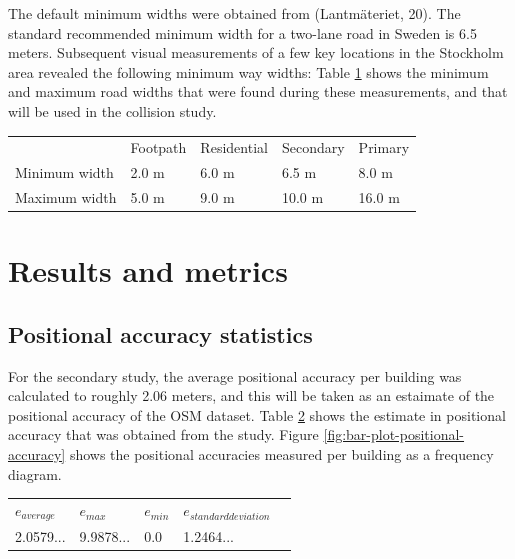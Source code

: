 \documentclass[a4paper]{article}
\begin{document}
The default minimum widths were obtained from (Lantmäteriet, 20). The standard recommended minimum width for a two-lane road in Sweden is 6.5 meters.
Subsequent visual measurements of a few key locations in the Stockholm area revealed the following minimum way widths:
Table \ref{table:road-widths} shows the minimum and maximum road widths that were found during these measurements, and that will be used in the collision study.

\begin{table}[H]
    \begin{tabular}{lllll}
                      & Footpath & Residential & Secondary & Primary \\
        Minimum width & 2.0 m    & 6.0 m       & 6.5 m     & 8.0 m   \\
        Maximum width & 5.0 m    & 9.0 m       & 10.0 m    & 16.0 m
    \end{tabular}
    \label{table:road-widths}
\end{table}

\section{Results and metrics}

\subsection{Positional accuracy statistics}

For the secondary study, the average positional accuracy per building was calculated to roughly 2.06 meters, and this will be taken as an estaimate of the positional accuracy of the OSM dataset.
Table \ref{table:positional-accuracy} shows the estimate in positional accuracy that was obtained from the study.
Figure \ref{fig:bar-plot-positional-accuracy} shows the positional accuracies measured per building as a frequency diagram.

\begin{table}[H]
    \begin{tabular}{lllll}
        $e_{average}$ & $e_{max}$ & $e_{min}$ & $e_{standard deviation}$ \\
        2.0579... & 9.9878... & 0.0 & 1.2464...
    \end{tabular}
    \label{table:positional-accuracy}
\end{table}
\end{document}
